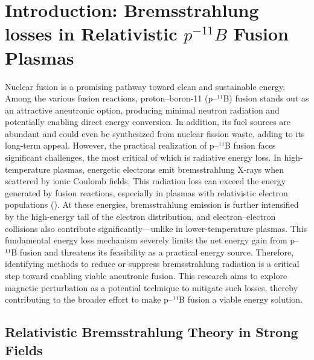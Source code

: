 \documentclass[12pt]{article}
\begin{document}
\section{Introduction: Bremsstrahlung losses in Relativistic $p^{-11}B$ Fusion Plasmas}

Nuclear fusion is a promising pathway toward clean and sustainable energy. Among the various fusion reactions, proton–boron-11 (p–¹¹B) fusion stands out as an attractive aneutronic option, producing minimal neutron radiation and potentially enabling direct energy conversion. In addition, its fuel sources are abundant and could even be synthesized from nuclear fission waste, adding to its long-term appeal.
However, the practical realization of p–¹¹B fusion faces significant challenges, the most critical of which is radiative energy loss. In high-temperature plasmas, energetic electrons emit bremsstrahlung X-rays when scattered by ionic Coulomb fields. This radiation loss can exceed the energy generated by fusion reactions, especially in plasmas with relativistic electron populations (\cite{SuppressionBremsstrahlung}). At these energies, bremsstrahlung emission is further intensified by the high-energy tail of the electron distribution, and electron–electron collisions also contribute significantly—unlike in lower-temperature plasmas.
This fundamental energy loss mechanism severely limits the net energy gain from p–¹¹B fusion and threatens its feasibility as a practical energy source. Therefore, identifying methods to reduce or suppress bremsstrahlung radiation is a critical step toward enabling viable aneutronic fusion. This research aims to explore magnetic perturbation as a potential technique to mitigate such losses, thereby contributing to the broader effort to make p–¹¹B fusion a viable energy solution.

\subsection{Relativistic Bremsstrahlung Theory in Strong Fields}
\end{document}
